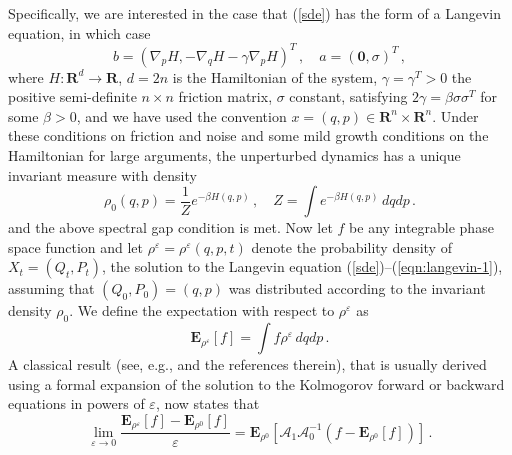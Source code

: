 \documentclass[]{tMPH2e}
\newcommand{\R}{{\mathbf R}}
\newcommand{\eps}{\varepsilon}
\newcommand{\cA}{\mathcal A}
\newcommand{\bE}{{\mathbf E}}
\newcommand{\zero}{{\mathbf 0}}
\newcommand{\wrt}{with respect to }
\begin{document}
Specifically, we are interested in the case that (\ref{sde}) has the form of a Langevin equation, in which case  
\begin{equation}\label{eqn:langevin-1}
b = \left(\nabla_{p}H, -\nabla_{q} H - \gamma\nabla_{p}H\right )^{T}\,,\quad a= (\zero,\sigma)^{T}\,,
\end{equation}
where $H\colon\R^{d}\to\R$, $d=2n$ is the Hamiltonian of the system, $\gamma=\gamma^{T}>0$ the positive semi-definite $n\times n$ friction matrix, $\sigma$ constant, satisfying $2\gamma=\beta\sigma\sigma^{T}$ for some $\beta>0$, and we have used the convention $x=(q,p)\in\R^{n}\times\R^{n}$. Under these conditions on friction and noise and some mild growth conditions on the Hamiltonian for large arguments, the unperturbed dynamics has a unique invariant measure with density 
\[
\rho_{0}(q,p) = \frac{1}{Z}e^{-\beta H(q,p)}\,,\quad  Z=\int  e^{-\beta H(q,p)}\,dqdp\,.
\] 
and the above spectral gap condition is met. Now let $f$ be any integrable phase space function and let $\rho^{\eps}=\rho^{\eps}(q,p,t)$ denote the probability density of $X_t=(Q_{t},P_{t})$, the solution to the Langevin equation (\ref{sde})--(\ref{eqn:langevin-1}), assuming that $(Q_{0},P_{0})=(q,p)$ was distributed according to the invariant density $\rho_{0}$. We define the expectation \wrt $\rho^{\eps}$ as 
\[
\bE_{\rho^{\eps}}[f] = \int f \rho^{\eps} \,dqdp\,.
\] 
A classical result (see, e.g., \cite{HairerMaijda08} and the references therein), that is usually derived using a formal expansion of the solution to the Kolmogorov forward or backward equations in powers of $\eps$, now states that 
\begin{equation}\label{lr}
\lim_{\eps\to 0}\frac{\bE_{\rho^{\eps}}[f] - \bE_{\rho^{0}}[f]}{\eps} = \bE_{\rho^{0}}[\cA_{1}\cA_{0}^{-1}(f-\bE_{\rho^{0}}[f])]\,.
\end{equation}
\end{document}
